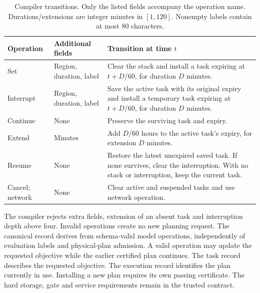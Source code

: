 \documentclass[preprint,12pt]{elsarticle}
\begin{document}
\begin{table}[t]
\centering\small
\caption{Compiler transitions. Only the listed fields accompany the operation
name. Durations/extensions are integer minutes in $[1,120]$. Nonempty labels
contain at most 80 characters.}
\label{tab:task-state-operations}
\begin{tabular}{@{}p{}p{}p{}@{}}
\toprule
Operation & Additional fields & Transition at time $t$\\
\midrule
Set & Region, duration, label & Clear the stack and install a task expiring at
$t+D/60$, for duration $D$ minutes.\\
Interrupt & Region, duration, label & Save the active task with its original
expiry and install a temporary task expiring at $t+D/60$, for duration $D$ minutes.\\
Continue & None & Preserve the surviving task and expiry.\\
Extend & Minutes & Add $D/60$ hours to the active task's expiry, for extension $D$ minutes.\\
Resume & None & Restore the latest unexpired saved task. If none survives,
clear the interruption. With no stack or interruption, keep the current task.\\
Cancel; network & None & Clear active and suspended tasks and use network operation.\\
\bottomrule
\end{tabular}
\end{table}

The compiler rejects extra fields, extension of an absent task and
interruption depth above four. Invalid operations create no new planning
request. The canonical record derives from schema-valid model operations,
independently of evaluation labels and physical-plan admission. A valid operation may update the requested objective while the earlier
certified plan continues. The task record describes the requested objective.
The execution record identifies the plan currently in use. Installing a new
plan requires its own passing certificate.
The hard storage, gate and service requirements remain in the trusted contract.
\end{document}
